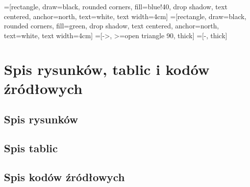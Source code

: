 \documentclass[a4paper,12pt]{article}
\begin{document}
=[rectangle, draw=black, rounded corners, fill=blue!40, drop shadow,
        text centered, anchor=north, text=white, text width=4cm]
=[rectangle, draw=black, rounded corners, fill=green, drop shadow,
        text centered, anchor=north, text=white, text width=4cm]
=[->, >=open triangle 90, thick]
=[-, thick]
\lstset{numbers=left, stepnumber=1, numbersep=10pt, frame=single}
\lstset{frameround=tttt}
\renewcommand{\lstlistlistingname}{\vspace*{-13mm}}
\renewcommand{\listfigurename}{\vspace*{-13mm}}
\renewcommand{\listtablename}{\vspace*{-13mm}}
\renewcommand*{\refname}{\vspace*{-13mm}}
\renewcommand{\lstlistingname}{Kod źródłowy} 


\tableofcontents 
{}
\clearpage

\section{Spis rysunków, tablic i kodów źródłowych}
\subsection{Spis rysunków}
\renewcommand*\numberline[1]{Rysunek\,#1:\indent}
\listoffigures
\subsection{Spis tablic}
\renewcommand*\numberline[1]{Tablica\,#1:\indent}
\listoftables
\subsection{Spis kodów źródłowych}
\renewcommand*\numberline[1]{Kod źródłowy\,#1:\indent}
\lstlistoflistings
\end{document}
